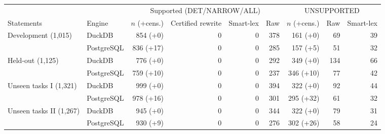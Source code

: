 \begin{tabular}{@{}ll rrrr rrr@{}}
\toprule
 & & \multicolumn{4}{c}{Supported (DET/NARROW/ALL)} & \multicolumn{3}{c}{UNSUPPORTED} \\
\cmidrule(lr){3-6}\cmidrule(l){7-9}
Statements & Engine & $n$ (+cens.) & Certified rewrite & Smart-lex & Raw & $n$ (+cens.) & Raw & Smart-lex \\
\midrule
Development (1,015) & DuckDB & 854 (+0) & 0 & 0 & 378 & 161 (+0) & 69 & 39 \\
 & PostgreSQL & 836 (+17) & 0 & 0 & 285 & 157 (+5) & 51 & 32 \\
\midrule
Held-out (1,125) & DuckDB & 776 (+0) & 0 & 0 & 292 & 349 (+0) & 134 & 66 \\
 & PostgreSQL & 759 (+10) & 0 & 0 & 237 & 346 (+10) & 77 & 42 \\
\midrule
Unseen tasks I (1,321) & DuckDB & 999 (+0) & 0 & 0 & 394 & 322 (+0) & 92 & 44 \\
 & PostgreSQL & 978 (+16) & 0 & 0 & 301 & 295 (+32) & 61 & 32 \\
\midrule
Unseen tasks II (1,267) & DuckDB & 945 (+0) & 0 & 0 & 344 & 322 (+0) & 79 & 31 \\
 & PostgreSQL & 930 (+9) & 0 & 0 & 276 & 302 (+26) & 58 & 24 \\
\bottomrule
\end{tabular}
